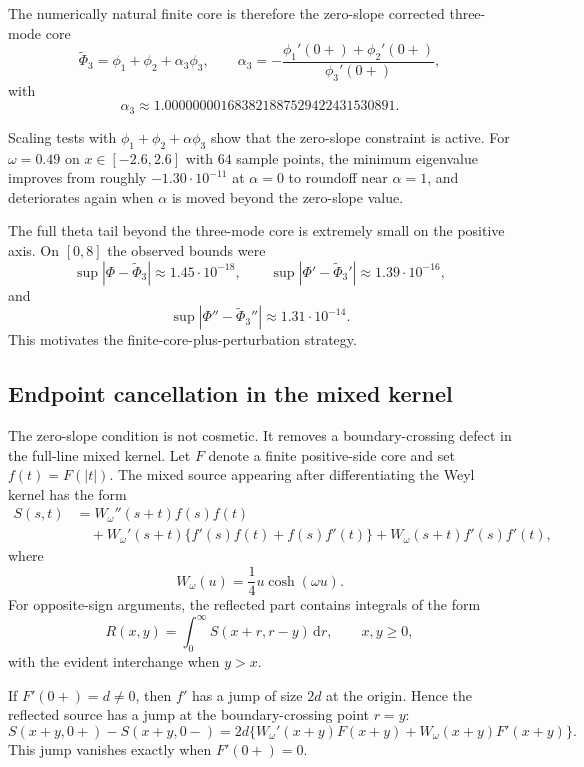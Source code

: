 \documentclass[11pt]{article}
\newcommand{\dd}{\,\mathrm d}
\begin{document}
The numerically natural finite core is therefore the zero-slope corrected
three-mode core
\begin{equation}
   \widetilde\Phi_3
   =
   \phi_1+\phi_2+\alpha_3\phi_3,
   \qquad
   \alpha_3
   =
   -\frac{\phi_1'(0+)+\phi_2'(0+)}{\phi_3'(0+)},
   \label{eq:tildePhi3}
\end{equation}
with
\[
   \alpha_3
   \approx
   1.000000001683821887529422431530891.
\]

Scaling tests with $\phi_1+\phi_2+\alpha\phi_3$ show that the zero-slope
constraint is active.  For $\omega=0.49$ on $x\in[-2.6,2.6]$ with $64$ sample
points, the minimum eigenvalue improves from roughly $-1.30\cdot 10^{-11}$ at
$\alpha=0$ to roundoff near $\alpha=1$, and deteriorates again when
$\alpha$ is moved beyond the zero-slope value.

The full theta tail beyond the three-mode core is extremely small on the
positive axis.  On $[0,8]$ the observed bounds were
\[
  \sup|\Phi-\widetilde\Phi_3|\approx 1.45\cdot 10^{-18},\qquad
  \sup|\Phi'-\widetilde\Phi_3'|\approx 1.39\cdot 10^{-16},
\]
and
\[
  \sup|\Phi''-\widetilde\Phi_3''|\approx 1.31\cdot 10^{-14}.
\]
This motivates the finite-core-plus-perturbation strategy.

\subsection{Endpoint cancellation in the mixed kernel}

The zero-slope condition is not cosmetic.  It removes a boundary-crossing
defect in the full-line mixed kernel.  Let $F$ denote a finite positive-side
core and set $f(t)=F(|t|)$.  The mixed source appearing after differentiating
the Weyl kernel has the form
\begin{equation}
\begin{aligned}
 S(s,t)
 &=
 W_\omega''(s+t) f(s)f(t)
 \\
 &\quad+
 W_\omega'(s+t)\{f'(s)f(t)+f(s)f'(t)\}
 +
 W_\omega(s+t)f'(s)f'(t),
\end{aligned}
\label{eq:mixed-source}
\end{equation}
where
\[
   W_\omega(u)=\frac14u\cosh(\omega u).
\]
For opposite-sign arguments, the reflected part contains integrals of the
form
\[
   R(x,y)=\int_0^\infty S(x+r,r-y)\dd r,
   \qquad x,y\ge 0,
\]
with the evident interchange when $y>x$.

If $F'(0+)=d\ne 0$, then $f'$ has a jump of size $2d$ at the origin.  Hence
the reflected source has a jump at the boundary-crossing point $r=y$:
\begin{equation}
 S(x+y,0+)-S(x+y,0-)
 =
 2d\{W_\omega'(x+y)F(x+y)+W_\omega(x+y)F'(x+y)\}.
 \label{eq:endpoint-jump}
\end{equation}
This jump vanishes exactly when $F'(0+)=0$.
\end{document}
